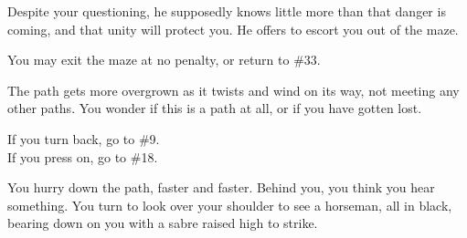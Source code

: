 \documentclass[white]{gl2018}
\begin{document}
\begin{large}
\begin{location}{25}
Despite your questioning, he supposedly knows little more than that danger is coming, and that unity will protect you.  He offers to escort you out of the maze.
\begin{fromhere}
You may exit the maze at no penalty, or return to \#33.
\end{fromhere}
\end{location}
\begin{location}{26}
The path gets more overgrown as it twists and wind on its way, not meeting any other paths. You wonder if this is a path at all, or if you have gotten lost. 
\begin{fromhere}If you turn back, go to \#9.\\ If you press on, go to \#18.\end{fromhere}
\end{location}
\begin{location}{27}
You hurry down the path,  faster and faster. Behind you, you think you hear something. You turn to look over your shoulder to see a horseman, all in black, bearing down on you with a sabre raised high to strike. 


\end{location}
\end{large}
\end{document}
